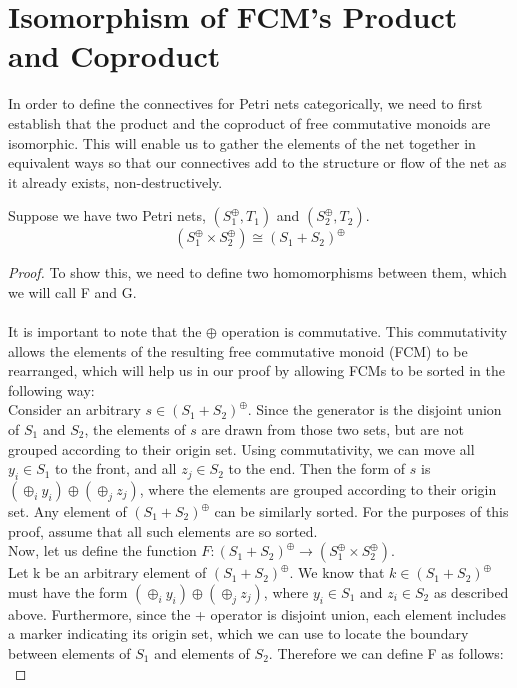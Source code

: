 \section{Isomorphism of FCM's Product and Coproduct} 
In order to define the connectives for Petri nets categorically, we need to first establish that the product and the coproduct of free commutative monoids are isomorphic. This will enable us to gather the elements of the net together in equivalent ways so that our connectives add to the structure or flow of the net as it already exists, non-destructively. 
\begin{lemma}
Suppose we have two Petri nets, $(S_1^\oplus, T_1)$ and $(S_2^\oplus, T_2)$.\\ 
\[(S_1 ^\oplus \times S_2 ^\oplus) \cong (S_1 + S_2)^\oplus\]
\begin{proof}
To show this, we need to define two homomorphisms between them, which we will call F and G.\\
\bigskip\\
It is important to note that the $\oplus$ operation is commutative. This commutativity allows the elements of the resulting free commutative monoid (FCM) to be rearranged, which will help us in our proof by allowing FCMs to be sorted in the following way:\bigskip\\
Consider an arbitrary $s \in (S_1 + S_2)^\oplus$. Since the generator is the disjoint union of $S_1$ and $S_2$, the elements of $s$ are drawn from those two sets, but are not grouped according to their origin set. Using commutativity, we can move all $y_i \in S_1$ to the front, and all $z_j \in S_2$ to the end. Then the form of $s$ is $(\oplus_i y_i) \oplus (\oplus_j z_j)$, where the elements are grouped according to their origin set. Any element of $(S_1 + S_2)^\oplus$ can be similarly sorted. For the purposes of this proof, assume that all such elements are so sorted.\bigskip \\
Now, let us define the function $F: (S_1 + S_2)^\oplus \to (S_1 ^\oplus \times S_2 ^\oplus)$.\\
Let k be an arbitrary element of $(S_1 + S_2)^\oplus$. We know that $k \in (S_1 + S_2)^\oplus$ must have the form $(\oplus_i y_i) \oplus (\oplus_j z_j)$, where $y_i \in S_1$ and $z_i \in S_2$ as described above. Furthermore, since the + operator is disjoint union, each element includes a marker indicating its origin set, which we can use to locate the boundary between elements of $S_1$ and elements of $S_2$. Therefore we can define F as follows:\\

\end{proof}
\end{lemma}
